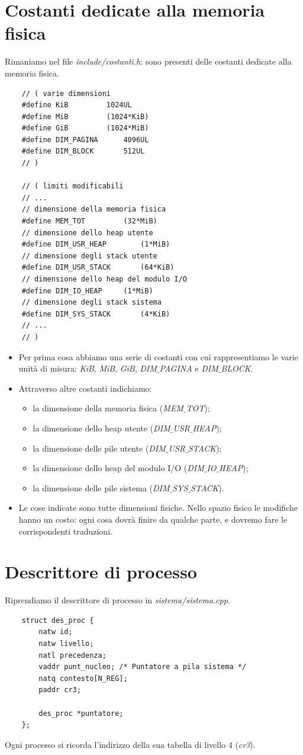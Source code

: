 \section{Costanti dedicate alla memoria fisica}
Rimaniamo nel file \emph{include/costanti.h}: sono presenti delle costanti dedicate alla memoria fisica.
\small 
\begin{verbatim}
	// ( varie dimensioni
	#define KiB			1024UL
	#define MiB			(1024*KiB)
	#define GiB			(1024*MiB)
	#define DIM_PAGINA		4096UL
	#define DIM_BLOCK		512UL
	// )
	
	// ( limiti modificabili
	// ...
	// dimensione della memoria fisica
	#define MEM_TOT			(32*MiB)
	// dimensione dello heap utente
	#define DIM_USR_HEAP		(1*MiB)
	// dimensione degli stack utente
	#define DIM_USR_STACK		(64*KiB)
	// dimensione dello heap del modulo I/O
	#define DIM_IO_HEAP		(1*MiB)
	// dimensione degli stack sistema
	#define DIM_SYS_STACK		(4*KiB)
	// ...
	// )
\end{verbatim}
\normalsize 
\begin{itemize}
	\item Per prima cosa abbiamo una serie di costanti con cui rappresentiamo le varie unità di misura: \emph{KiB}, \emph{MiB}, \emph{GiB}, \emph{DIM$\_$PAGINA} e \emph{DIM$\_$BLOCK}.
	\item Attraverso altre costanti indichiamo:
	\begin{itemize}
		\item la dimensione della memoria fisica (\emph{MEM$\_$TOT});
		\item la dimensione dello heap utente (\emph{DIM$\_$USR$\_$HEAP});
		\item la dimensione delle pile utente (\emph{DIM$\_$USR$\_$STACK});
		\item la dimensione dello heap del modulo I/O (\emph{DIM$\_$IO$\_$HEAP});
		\item la dimensione delle pile sistema (\emph{DIM$\_$SYS$\_$STACK}).
	\end{itemize}
	\item Le cose indicate sono tutte dimensioni fisiche. Nello spazio fisico le modifiche hanno un costo: ogni cosa dovrà finire da qualche parte, e dovremo fare le corrispondenti traduzioni.
\end{itemize}

\section{Descrittore di processo}
Riprendiamo il descrittore di processo in \emph{sistema/sistema.cpp}. 
\small 
\begin{verbatim}	
	struct des_proc {
		natw id;
		natw livello;
		natl precedenza;
		vaddr punt_nucleo; /* Puntatore a pila sistema */
		natq contesto[N_REG];
		paddr cr3;
		
		des_proc *puntatore;
	};
\end{verbatim}
\normalsize 
Ogni processo si ricorda l'indirizzo della sua tabella di livello $4$ (\emph{cr3}). 
